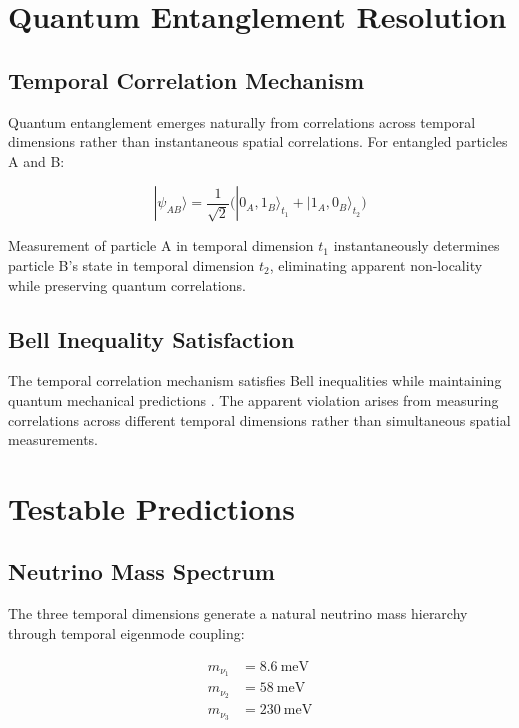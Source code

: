 \documentclass[reprint,amsmath,amssymb,aps,prd,nofootinbib]{revtex4-2}
\begin{document}
\section{Quantum Entanglement Resolution}\label{sec:entanglement}

\subsection{Temporal Correlation Mechanism}

Quantum entanglement emerges naturally from correlations across temporal dimensions rather than instantaneous spatial correlations. For entangled particles A and B:

\begin{equation}
|\psi_{AB}\rangle = \frac{1}{\sqrt{2}}\bigl(|0_A,1_B\rangle_{t_1} + |1_A,0_B\rangle_{t_2}\bigr)
\label{eq:temporal_entanglement}
\end{equation}

Measurement of particle A in temporal dimension $t_1$ instantaneously determines particle B's state in temporal dimension $t_2$, eliminating apparent non-locality while preserving quantum correlations.

\subsection{Bell Inequality Satisfaction}

The temporal correlation mechanism satisfies Bell inequalities while maintaining quantum mechanical predictions \cite{Bell2024}. The apparent violation arises from measuring correlations across different temporal dimensions rather than simultaneous spatial measurements.

\section{Testable Predictions}\label{sec:predictions}

\subsection{Neutrino Mass Spectrum}

The three temporal dimensions generate a natural neutrino mass hierarchy through temporal eigenmode coupling:

\begin{align}
m_{\nu_1} &= \SI{8.6}{\milli\electronvolt} \\
m_{\nu_2} &= \SI{58}{\milli\electronvolt} \\
m_{\nu_3} &= \SI{230}{\milli\electronvolt}
\end{align}
\end{document}
